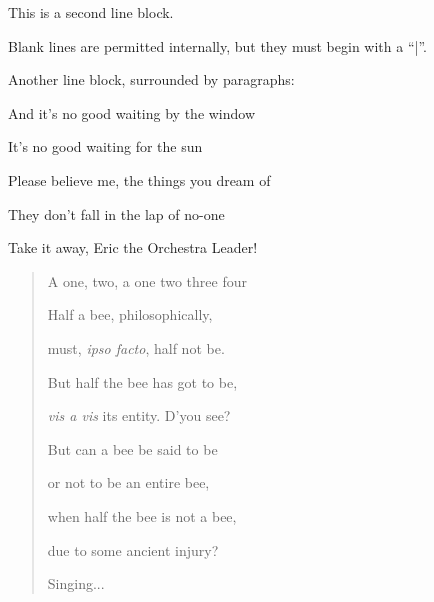 \documentclass[a4paper]{article}
\newenvironment{DUlineblock}[1]{%
    \list{}{\setlength{\partopsep}{\parskip}
            \addtolength{\partopsep}{\baselineskip}
            \setlength{\topsep}{0pt}
            \setlength{\itemsep}{0.15\baselineskip}
            \setlength{\parsep}{0pt}
            \setlength{\leftmargin}{#1}}
    \raggedright
  }
  {\endlist}
\begin{document}
\begin{DUlineblock}{0em}
\item[] This is a second line block.
\item[] 
\item[] Blank lines are permitted internally, but they must begin with a ``|''.
\end{DUlineblock}

Another line block, surrounded by paragraphs:

\begin{DUlineblock}{0em}
\item[] And it's no good waiting by the window
\item[] It's no good waiting for the sun
\item[] Please believe me, the things you dream of
\item[] They don't fall in the lap of no-one
\end{DUlineblock}

Take it away, Eric the Orchestra Leader!
%
\begin{quote}

\begin{DUlineblock}{0em}
\item[] A one, two, a one two three four
\item[] 
\item[] Half a bee, philosophically,
\item[]
\begin{DUlineblock}{\DUlineblockindent}
\item[] must, \emph{ipso facto}, half not be.
\end{DUlineblock}
\item[] But half the bee has got to be,
\item[]
\begin{DUlineblock}{\DUlineblockindent}
\item[] \emph{vis a vis} its entity.  D'you see?
\item[] 
\end{DUlineblock}
\item[] But can a bee be said to be
\item[]
\begin{DUlineblock}{\DUlineblockindent}
\item[] or not to be an entire bee,
\item[]
\begin{DUlineblock}{\DUlineblockindent}
\item[] when half the bee is not a bee,
\item[]
\begin{DUlineblock}{\DUlineblockindent}
\item[] due to some ancient injury?
\item[] 
\end{DUlineblock}
\end{DUlineblock}
\end{DUlineblock}
\item[] Singing...
\end{DUlineblock}

\end{quote}
\end{document}
